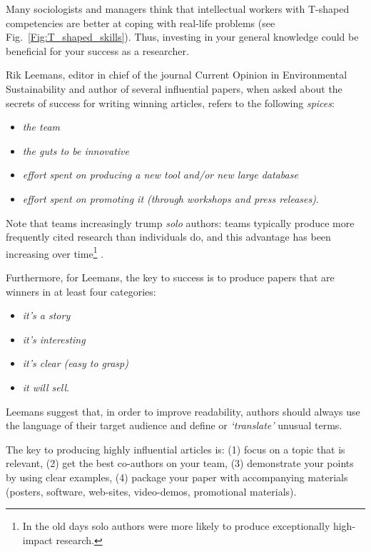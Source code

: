 \documentclass[graybox,envcountchap,sectrefs,UStrade]{svmono}
\begin{document}
Many sociologists and managers think that intellectual workers with T-shaped competencies are better at coping with real-life problems (see Fig.\@~\ref{Fig:T_shaped_skills}). Thus, investing in your general knowledge could be beneficial for your success as a researcher. \par

Rik Leemans, editor in chief of the journal Current Opinion in Environmental Sustainability and author of several influential papers, when asked about the secrets of success for writing winning articles, refers to the following \emph{spices}:

\begin{itemize}\renewcommand{\labelitemi}{$\checkmark$}
  \item \emph{the team}
  \item \emph{the guts to be innovative}
  \item \emph{effort spent on producing a new tool and/or new large database}
  \item \emph{effort spent on promoting it (through workshops and press releases)}.
\end{itemize}

Note that teams increasingly trump \emph{solo} authors: teams typically produce more frequently cited research than individuals do, and this advantage has been increasing over time\footnote{In the old days solo authors were more likely to produce exceptionally high-impact research.} \citep{Wuchty2007}.\par

Furthermore, for Leemans, the key to success is to produce papers that are winners in at least four categories:

\begin{itemize}
  \item \emph{it's a story}
  \item \emph{it's interesting}
  \item \emph{it's clear (easy to grasp)}
  \item \emph{it will sell}.
\end{itemize}

Leemans suggest that, in order to improve readability, authors should always use the language of their target audience and define or \emph{`translate'} unusual terms.\par

\begin{svgraybox}
The key to producing highly influential articles is: (1) focus on a topic that is relevant, (2) get the best co-authors on your team, (3) demonstrate your points by using clear examples, (4) package your paper with accompanying materials (posters, software, web-sites, video-demos, promotional materials).
\end{svgraybox}\label{R:success}
\end{document}
